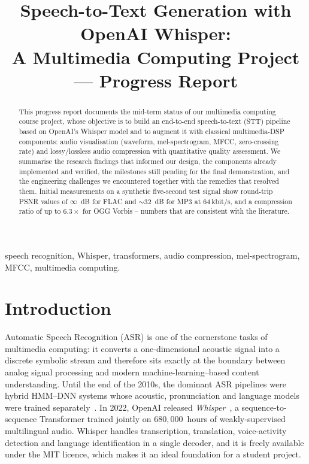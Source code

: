 \documentclass[conference]{IEEEtran}
\title{Speech-to-Text Generation with OpenAI Whisper:\\
A Multimedia Computing Project --- Progress Report}
\author{
\IEEEauthorblockN{[Your Name]}
\IEEEauthorblockA{Student ID: [Your ID] \\
Department of Computer Engineering \\
[Your University] \\
Email: [your.email@example.com]}
}
\begin{document}
\maketitle

\begin{abstract}
This progress report documents the mid-term status of our multimedia
computing course project, whose objective is to build an end-to-end
speech-to-text (STT) pipeline based on OpenAI's Whisper model and to
augment it with classical multimedia-DSP components: audio visualisation
(waveform, mel-spectrogram, MFCC, zero-crossing rate) and lossy/lossless
audio compression with quantitative quality assessment.  We summarise the
research findings that informed our design, the components already
implemented and verified, the milestones still pending for the final
demonstration, and the engineering challenges we encountered together
with the remedies that resolved them.  Initial measurements on a synthetic
five-second test signal show round-trip PSNR values of $\infty$~dB for FLAC
and $\sim 32$~dB for MP3 at 64\,kbit/s, and a compression ratio of up to
$6.3\times$ for OGG Vorbis -- numbers that are consistent with the
literature.
\end{abstract}

\begin{IEEEkeywords}
speech recognition, Whisper, transformers, audio compression,
mel-spectrogram, MFCC, multimedia computing.
\end{IEEEkeywords}

\section{Introduction}
Automatic Speech Recognition (ASR) is one of the cornerstone tasks of
multimedia computing: it converts a one-dimensional acoustic signal into a
discrete symbolic stream and therefore sits exactly at the boundary between
analog signal processing and modern machine-learning--based content
understanding.  Until the end of the 2010s, the dominant ASR pipelines were
hybrid HMM--DNN systems whose acoustic, pronunciation and language models
were trained separately~\cite{hinton2012deep}.  In 2022, OpenAI released
\emph{Whisper}~\cite{radford2022whisper}, a sequence-to-sequence Transformer
trained jointly on $680{,}000$~hours of weakly-supervised multilingual
audio.  Whisper handles transcription, translation, voice-activity
detection and language identification in a single decoder, and it is freely
available under the MIT licence, which makes it an ideal foundation for a
student project.
\end{document}
